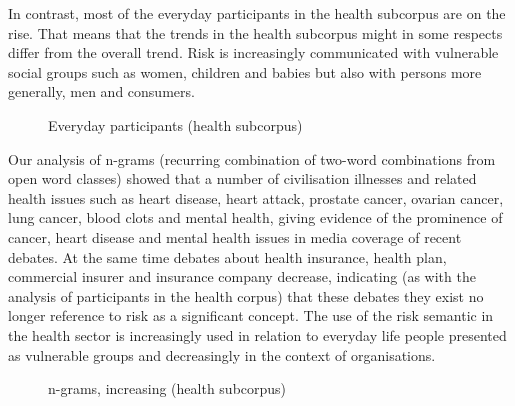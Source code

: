In contrast, most of the everyday participants in the health subcorpus are on the rise. That means that the trends in the health subcorpus might in some respects differ from the overall trend. Risk is increasingly communicated with vulnerable social groups such as women, children and babies but also with persons more generally, men and consumers.

\begin{figure}[htb!]
\centering
{}
\caption{Everyday participants (health subcorpus)}
\end{figure}

Our analysis of n-grams (recurring combination of two-word combinations from open word classes) showed that a number of civilisation illnesses and related health issues such as heart disease, heart attack, prostate cancer, ovarian cancer, lung cancer, blood clots and mental health, giving evidence of the prominence of cancer, heart disease and mental health issues in media coverage of recent debates. At the same time debates about health insurance, health plan, commercial insurer and insurance company decrease, indicating (as with the analysis of participants in the health corpus) that these debates they exist no longer reference to risk as a significant concept. The use of the risk semantic in the health sector is increasingly used in relation to everyday life people presented as vulnerable groups and decreasingly in the context of organisations. 

\begin{figure}[htb!]
\centering
{}
\caption{n-grams, increasing (health subcorpus)}
\end{figure}


